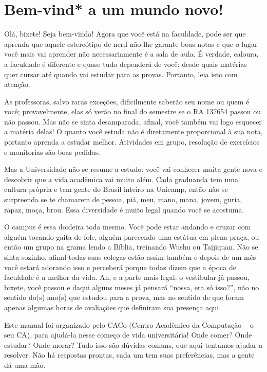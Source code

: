 
\section{Bem-vind* a um mundo novo!}

Olá, bixete! Seja bem-vinda! Agora que você está na faculdade, pode ser que
aprenda que aquele estereótipo de nerd não lhe garante boas notas e que o lugar
você mais vai aprender não necessariamente é a sala de aula. É verdade,
caloura, a faculdade é diferente e quase tudo dependerá de você: desde quais
matérias quer cursar até quando vai estudar para as provas. Portanto, leia isto
com atenção.

As professoras, salvo raras exceções, dificilmen\-te saberão seu nome ou quem é
você; provavelmente, elas só verão no final do semestre se o RA 137654 passou
ou não passou. Mas não se sinta desamparada, afinal, você também vai logo
esquecer a matéria delas! O quanto você estuda não é diretamente proporcional à
sua nota, portanto aprenda a estudar melhor. Atividades em grupo, resolução de
exercícios e monitorias são boas pedidas.

Mas a Universidade não se resume a estudo: você vai conhecer muita gente nova e
descobrir que a vida acadêmica vai muito além.  Cada graduanda tem uma cultura
própria e tem gente do Brasil inteiro na Unicamp, então não se surpreenda se te
chamarem de pessoa, piá, meu, mano, mana, jovem, guria, rapaz, moça, brou.
Essa diversidade é muito legal quando você se acostuma.

O campus é essa doideira toda mesmo. Você pode estar andando e cruzar com
alguém tocando gaita de fole, alguém parecendo uma estátua em plena praça, ou
então um grupo na grama lendo a Bíblia, treinando Wushu ou Taijiquan. Não se
sinta sozinho, afinal todas suas colegas estão assim também e depois de um mês
você estará adorando isso e perceberá porque todas dizem que a época de
faculdade é a melhor da vida. Ah, e a parte mais legal: o vestibular já passou,
bixete, você passou e daqui alguns meses já pensará ``nossa, era só isso?'',
não no sentido do(s) ano(s) que estudou para a prova, mas no sentido de que
foram apenas algumas horas de avaliações que definiram sua presença aqui.

Este manual foi organizado pelo CACo (Centro Acadêmico da Computação -- o seu
CA), para ajudá-la nesse começo de vida universitária! Onde comer? Onde
estudar? Onde morar? Tudo isso são dúvidas comuns, que aqui tentamos ajudar a
resolver. Não há respostas prontas, cada um tem suas preferências, mas a gente
dá uma mão.

